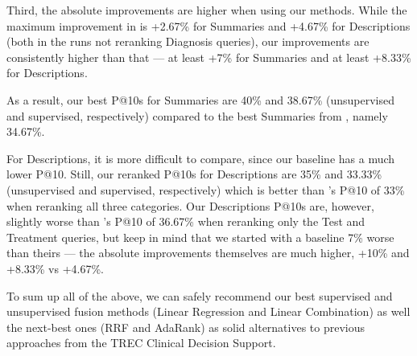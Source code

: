 Third, the absolute improvements are higher when using our methods. 
While the maximum improvement
in \cite{choi} is +2.67\% for Summaries and +4.67\% for Descriptions (both in the runs not reranking Diagnosis queries), 
our improvements are consistently
higher than that --- at least +7\% for Summaries and at least +8.33\% for Descriptions. 

As a result, our best P@10s for Summaries are 40\% and 38.67\%
(unsupervised and supervised, respectively) compared to the best Summaries from \cite{choi}, namely 34.67\%.

For Descriptions, it is more difficult to compare, since our baseline has a much lower P@10. 
Still, our reranked P@10s for Descriptions are 35\% and 33.33\% (unsupervised and supervised, respectively)
which is better than \cite{choi}'s P@10 of 33\% when reranking all three categories. 
Our Descriptions P@10s are, however, slightly worse
than \cite{choi}'s P@10 of 36.67\% when reranking only the Test and Treatment queries, but keep in mind that
we started with a baseline 7\% worse than theirs --- the absolute improvements themselves are much higher, +10\% and +8.33\%
vs +4.67\%.

To sum up all of the above, we can safely recommend our best supervised and unsupervised fusion methods
(Linear Regression and Linear Combination) as well the next-best ones (RRF and AdaRank)
as solid alternatives to previous approaches from the TREC Clinical Decision Support.






